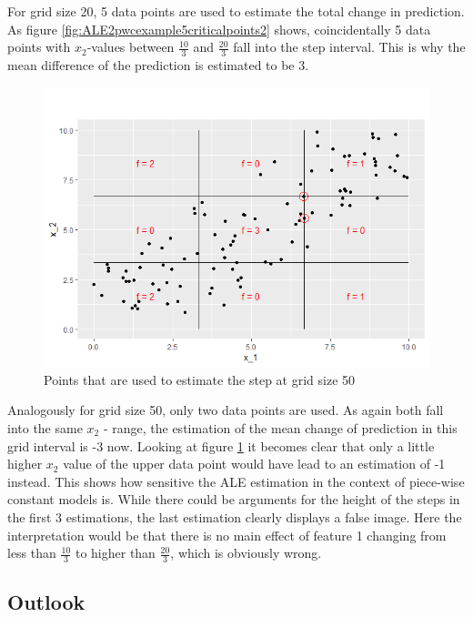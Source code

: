 \documentclass[]{krantz}
\begin{document}
For grid size 20, 5 data points are used to estimate the total change in
prediction. As figure \ref{fig:ALE2pwcexample5criticalpoints2} shows,
coincidentally 5 data points with \(x_2\)-values between
\(\frac{10}{3}\) and \(\frac{20}{3}\) fall into the step interval. This
is why the mean difference of the prediction is estimated to be 3.

\begin{figure}
\includegraphics[width=1\linewidth]{images/ALE_2_pwc_example5_critical_points_} \caption{Points that are used to estimate the
step at grid size 50}\label{fig:ALE2pwcexample5criticalpoints}
\end{figure}




Analogously for grid size 50, only two data points are used. As again
both fall into the same \(x_2\) - range, the estimation of the mean
change of prediction in this grid interval is -3 now. Looking at figure
\ref{fig:ALE2pwcexample5criticalpoints} it becomes clear that only a
little higher \(x_2\) value of the upper data point would have lead to
an estimation of -1 instead. This shows how sensitive the ALE estimation
in the context of piece-wise constant models is. While there could be
arguments for the height of the steps in the first 3 estimations, the
last estimation clearly displays a false image. Here the interpretation
would be that there is no main effect of feature 1 changing from less
than \(\frac{10}{3}\) to higher than \(\frac{20}{3}\), which is
obviously wrong.

\subsection{Outlook}\label{outlook}
\end{document}
